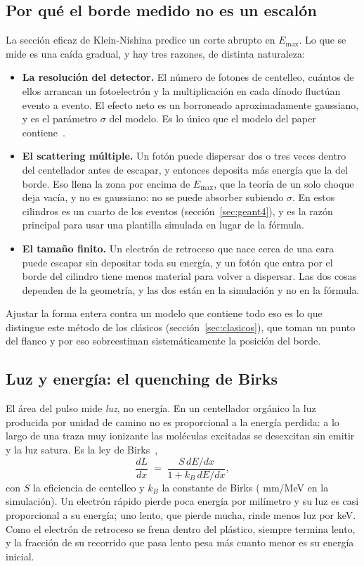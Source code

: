 \documentclass[11pt,a4paper]{article}
\begin{document}
\subsection{Por qué el borde medido no es un escalón}
\label{sec:noescalon}

La sección eficaz de Klein-Nishina predice un corte abrupto en $E_{\max}$. Lo
que se mide es una caída gradual, y hay tres razones, de distinta naturaleza:

\begin{itemize}
\item \textbf{La resolución del detector.} El número de fotones de
      centelleo, cuántos de ellos arrancan un fotoelectrón y la
      multiplicación en cada dínodo fluctúan evento a evento. El efecto neto
      es un borroneado aproximadamente gaussiano, y es el parámetro $\sigma$
      del modelo. Es lo único que el modelo del paper
      contiene~\cite{kong2025}.
\item \textbf{El scattering múltiple.} Un fotón puede dispersar dos o tres
      veces dentro del centellador antes de escapar, y entonces deposita más
      energía que la del borde. Eso llena la zona por encima de $E_{\max}$,
      que la teoría de un solo choque deja vacía, y no es gaussiano: no se
      puede absorber subiendo $\sigma$. En estos cilindros es un cuarto de
      los eventos (sección~\ref{sec:geant4}), y es la razón principal para
      usar una plantilla simulada en lugar de la fórmula.
\item \textbf{El tamaño finito.} Un electrón de retroceso que nace cerca de
      una cara puede escapar sin depositar toda su energía, y un fotón que
      entra por el borde del cilindro tiene menos material para volver a
      dispersar. Las dos cosas dependen de la geometría, y las dos están en
      la simulación y no en la fórmula.
\end{itemize}

\noindent
Ajustar la forma entera contra un modelo que contiene todo eso es lo que
distingue este método de los clásicos (sección~\ref{sec:clasicos}), que
toman un punto del flanco y por eso sobreestiman sistemáticamente la
posición del borde.

\subsection{Luz y energía: el quenching de Birks}
\label{sec:quenching}

El área del pulso mide \emph{luz}, no energía. En un centellador orgánico la
luz producida por unidad de camino no es proporcional a la energía perdida:
a lo largo de una traza muy ionizante las moléculas excitadas se desexcitan
sin emitir y la luz satura. Es la ley de Birks~\cite{birks1951},
\[
   \frac{dL}{dx} \;=\; \frac{S\,dE/dx}{1 + k_B\,dE/dx},
\]
con $S$ la eficiencia de centelleo y $k_B$ la constante de Birks
(\SimBirks{} mm/MeV en la simulación). Un electrón rápido pierde poca energía
por milímetro y su luz es casi proporcional a su energía; uno lento, que
pierde mucha, rinde menos luz por keV. Como el electrón de retroceso se frena
dentro del plástico, siempre termina lento, y la fracción de su recorrido que
pasa lento pesa más cuanto menor es su energía inicial.
\end{document}
